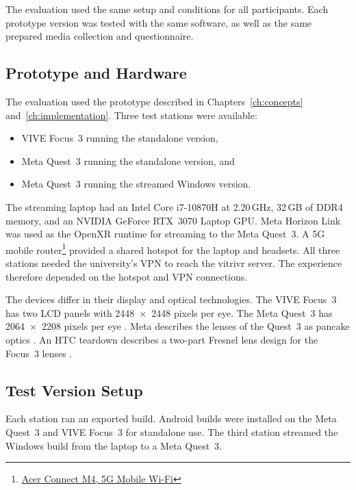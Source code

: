 The evaluation used the same setup and conditions for all participants. Each prototype version was tested with the same software, as well as the same prepared media collection and questionnaire.

\subsection{Prototype and Hardware}

The evaluation used the prototype described in Chapters~\ref{ch:concepts} and~\ref{ch:implementation}. Three test stations were available:

\begin{itemize}[leftmargin=*]
  \item VIVE Focus~3 running the standalone version,
  \item Meta Quest~3 running the standalone version, and
  \item Meta Quest~3 running the streamed Windows version.
\end{itemize}

The streaming laptop had an Intel Core i7-10870H at 2.20\,GHz, 32\,GB of DDR4 memory, and an NVIDIA GeForce RTX~3070 Laptop GPU. Meta Horizon Link was used as the OpenXR runtime for streaming to the Meta Quest~3. A 5G mobile router\footnote{\href{https://www.acer.com/ae-en/networking/5g/acer-connect-m4-5g-mobile-hotspot}{Acer Connect M4, 5G Mobile Wi-Fi}} provided a shared hotspot for the laptop and headsets. All three stations needed the university's VPN to reach the vitrivr server. The experience therefore depended on the hotspot and VPN connections.

The devices differ in their display and optical technologies. The VIVE Focus~3 has two LCD panels with 2448~$\times$~2448 pixels per eye. The Meta Quest~3 has 2064~$\times$~2208 pixels per eye \citep{viveFocus3Specs2026,metaQuestDeviceComparison2026}. Meta describes the lenses of the Quest~3 as pancake optics \citep{metaQuest3Pancake2023}. An HTC teardown describes a two-part Fresnel lens design for the Focus~3 lenses \citep{roadToVRFocus3Teardown2021}.

\subsection{Test Version Setup}

Each station ran an exported build. Android builds were installed on the Meta Quest~3 and VIVE Focus~3 for standalone use. The third station streamed the Windows build from the laptop to a Meta Quest~3.

